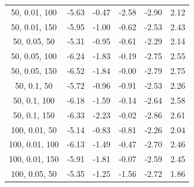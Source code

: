 \documentclass{article}
\begin{document}
\begin{table}[H]
{\begin{tabular}{|c|c|c|c|c|c|}
                50, 0.01, 100              & -5.63                      & -0.47                      & -2.58                      & -2.90                    & 2.12                    \\
                50, 0.01, 150              & -5.95                      & -1.00                      & -0.62                      & -2.53                    & 2.43                    \\
                50, 0.05, 50               & -5.31                      & -0.95                      & -0.61                      & -2.29                    & 2.14                    \\
                50, 0.05, 100              & -6.24                      & -1.83                      & -0.19                      & -2.75                    & 2.55                    \\
                50, 0.05, 150              & -6.52                      & -1.84                      & -0.00                      & -2.79                    & 2.75                    \\
                50, 0.1, 50                & -5.72                      & -0.96                      & -0.91                      & -2.53                    & 2.26                    \\
                50, 0.1, 100               & -6.18                      & -1.59                      & -0.14                      & -2.64                    & 2.58                    \\
                50, 0.1, 150               & -6.33                      & -2.23                      & -0.02                      & -2.86                    & 2.61                    \\
                100, 0.01, 50              & -5.14                      & -0.83                      & -0.81                      & -2.26                    & 2.04                    \\
                100, 0.01, 100             & -6.13                      & -1.49                      & -0.47                      & -2.70                    & 2.46                    \\
                100, 0.01, 150             & -5.91                      & -1.81                      & -0.07                      & -2.59                    & 2.45                    \\
                100, 0.05, 50              & -5.35                      & -1.25                      & -1.56                      & -2.72                    & 1.86                    \\

\end{tabular}}
\end{table}
\end{document}
